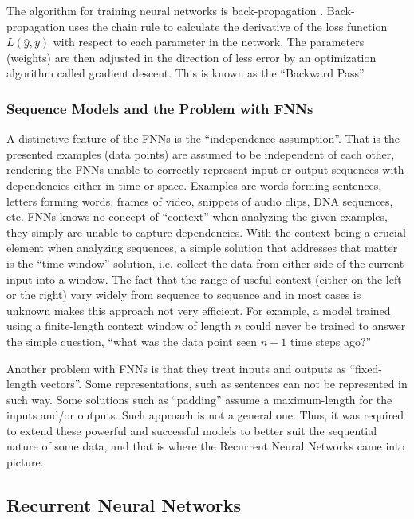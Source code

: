 The algorithm for training neural networks is back-propagation \cite{rumelhart1985learning}. Back-propagation uses the chain rule to calculate the derivative of the loss function $L(\widehat{y}, y)$ with respect to each parameter in the network. The parameters (weights) are then adjusted in the direction of less error by an optimization algorithm called gradient descent. This is known as the \enquote{Backward Pass}

\subsubsection{Sequence Models and the Problem with \ac{FNN}s}\label{bg:subsub1}

A distinctive feature of the \ac{FNN}s is the \enquote{independence assumption}. That is the presented examples (data points) are assumed to be independent of each other, rendering the \ac{FNN}s unable to correctly represent input or output sequences with dependencies either in time or space. Examples are words forming sentences, letters forming words, frames of video, snippets of audio clips, DNA sequences, etc. \ac{FNN}s knows no concept of “context” when analyzing the given examples, they simply are unable to capture dependencies. With the context being a crucial element when analyzing sequences, a simple solution that addresses that matter is the \enquote{time-window} solution, i.e. collect the data from either side of the current input into a window. The fact that the range of useful context (either on the left or the right) vary widely from sequence to sequence and in most cases is unknown makes this approach not very efficient.
For example, a model trained using a finite-length context window of length $n$ could never be trained to answer the simple question, \enquote{what was the data point seen $n+\mathrm{1}$ time steps ago?}


Another problem with \ac{FNN}s is that they treat inputs and outputs as \enquote{fixed-length vectors}. Some representations, such as sentences can not be represented in such way. Some  solutions such as \enquote{padding} assume a maximum-length for the inputs and/or outputs. Such approach is not a general one. 
Thus, it was required to extend these powerful and successful models to better suit the sequential nature of some data, and that is where the Recurrent Neural Networks came into picture.


\subsection{Recurrent Neural Networks} 
\label{bg:sub2}

